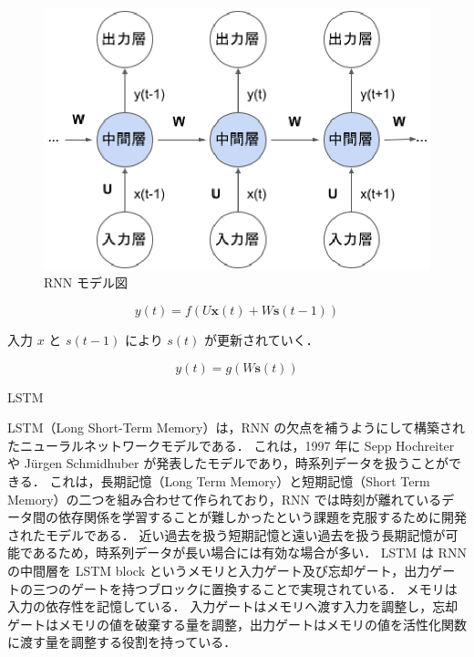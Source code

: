\documentclass[twocolumn,fleqn,10pt]{jarticle}
\makeatletter
\renewcommand{\subsection}{\@startsection
{subsection}{3}{0mm}{5mm}{0.01pt}{\bfseries \normalsize}}
\makeatother
\begin{document}
\begin{figure}[b]
  \includegraphics[width=\linewidth]{fig/chap2/RNN.eps}
  \caption{RNN モデル図}
  \label{fig:rnn}
\end{figure}



\vspace{-4mm}
\begin{equation}
    y(t) = f(U\bm{x}(t) + W\bm{s}(t - 1))
\end{equation}



入力 $x$ と $s(t - 1)$ により $s(t)$ が更新されていく．



\vspace{-4mm}
\begin{equation}
    y(t) = g(W\bm{s}(t))
\end{equation}












\subsection{LSTM}

LSTM（Long Short-Term Memory）は，RNN の欠点を補うようにして構築されたニューラルネットワークモデルである．
これは，1997 年に Sepp Hochreiter や J\"{u}rgen Schmidhuber が発表したモデルであり，時系列データを扱うことができる\cite{lstm}．
これは，長期記憶（Long Term Memory）と短期記憶（Short Term Memory）の二つを組み合わせて作られており，RNN では時刻が離れているデータ間の依存関係を学習することが難しかったという課題を克服するために開発されたモデルである．
近い過去を扱う短期記憶と遠い過去を扱う長期記憶が可能であるため，時系列データが長い場合には有効な場合が多い．
LSTM は RNN の中間層を LSTM block というメモリと入力ゲート及び忘却ゲート，出力ゲートの三つのゲートを持つブロックに置換することで実現されている．
メモリは入力の依存性を記憶している．
入力ゲートはメモリへ渡す入力を調整し，忘却ゲートはメモリの値を破棄する量を調整，出力ゲートはメモリの値を活性化関数に渡す量を調整する役割を持っている．
\end{document}
